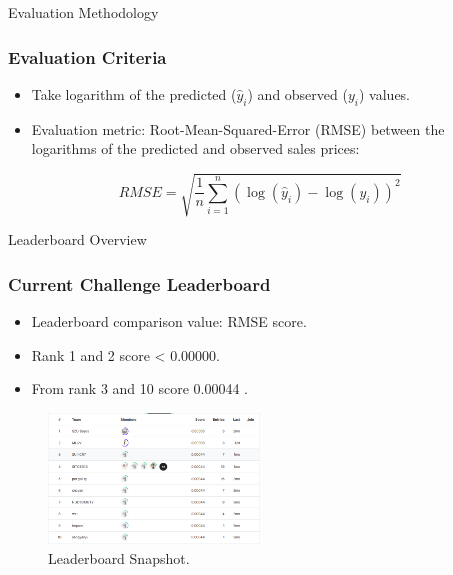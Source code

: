 \begin{frame}{Evaluation Methodology}
    \frametitle{Evaluation Criteria}
    \begin{itemize}
        \item Take logarithm of the predicted (\(\hat{y}_i\)) and observed (\(y_i\)) values.
        \item Evaluation metric: Root-Mean-Squared-Error (RMSE) between the logarithms of the predicted and observed sales prices:
    \end{itemize}
    \vspace{0.5cm}
    \begin{equation}
        RMSE = \sqrt{\frac{1}{n}\sum_{i=1}^{n} (\log(\hat{y}_i) - \log(y_i))^2}
        \label{eq:rmse}
    \end{equation}
\end{frame}

\begin{frame}{Leaderboard Overview}
    \frametitle{Current Challenge Leaderboard}
    \begin{itemize}
        \item Leaderboard comparison value: RMSE score.
        \item Rank 1 and 2 score < 0.00000.
        \item From rank 3 and 10 score 0.00044 .
    \end{itemize}
    \vspace{0.5cm}
    \begin{figure}
        \includegraphics[width=0.5\textwidth]{figures/leaderboard_snapshot.png} 
        \caption{Leaderboard Snapshot.}
        \label{fig:leaderboard_snapshot}
    \end{figure}
\end{frame}

